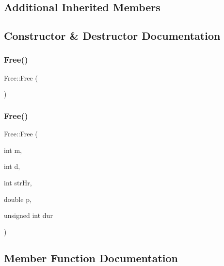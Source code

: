 \subsection*{Additional Inherited Members}


\subsection{Constructor \& Destructor Documentation}
\mbox{\label{class_free_a4a847fee0a934284fc4581282706e885}} 
\subsubsection{\texorpdfstring{Free()}{Free()}\hspace{0.1cm}{\footnotesize\ttfamily [1/2]}}
{\footnotesize\ttfamily Free\+::\+Free (\begin{DoxyParamCaption}{ }\end{DoxyParamCaption})\hspace{0.3cm}{\ttfamily [inline]}}

\mbox{\label{class_free_add02897be555344a947ad860ab73e679}} 
\subsubsection{\texorpdfstring{Free()}{Free()}\hspace{0.1cm}{\footnotesize\ttfamily [2/2]}}
{\footnotesize\ttfamily Free\+::\+Free (\begin{DoxyParamCaption}\item[{int}]{m,  }\item[{int}]{d,  }\item[{int}]{str\+Hr,  }\item[{double}]{p,  }\item[{unsigned int}]{dur }\end{DoxyParamCaption})}



\subsection{Member Function Documentation}
\mbox{\label{class_free_a229f009a7535eeba0a6ff4495de8c6bf}} 
